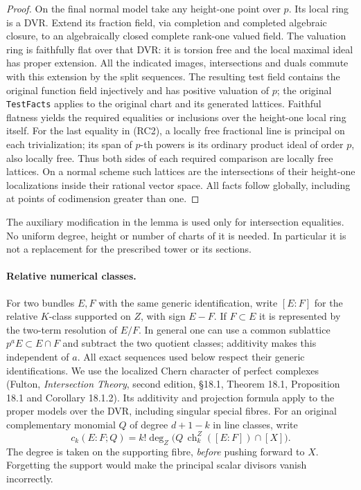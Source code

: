\begin{proof}
On the final normal model take any height-one point over \(p\).
Its local ring is a DVR. Extend its fraction field, via completion
and completed algebraic closure, to an algebraically closed
complete rank-one valued field. The valuation ring is faithfully
flat over that DVR: it is torsion free and the local maximal
ideal has proper extension. All the indicated images, intersections
and duals commute with this extension by the split sequences.
The resulting test field contains the original function field
injectively and has positive valuation of \(p\); the original
\texttt{TestFacts} applies to the original chart and its
generated lattices. Faithful flatness yields the required equalities
or inclusions over the height-one local ring itself.
For the last equality in (RC2), a locally free fractional
line is principal on each trivialization; its span of \(p\)-th
powers is its ordinary product ideal of order \(p\), also
locally free. Thus both sides of each required comparison
are locally free lattices. On a normal scheme such lattices
are the intersections of their height-one localizations
inside their rational vector space. All facts follow globally,
including at points of codimension greater than one.
\end{proof}

The auxiliary modification in the lemma is used only for
intersection equalities. No uniform degree, height or number of
charts of it is needed. In particular it is not a replacement
for the prescribed tower or its sections.

\paragraph{Relative numerical classes.}
For two bundles \(E,F\) with the same generic identification,
write \([E:F]\) for the relative \(K\)-class supported on
\(Z\), with sign \(E-F\). If \(F\subset E\) it is represented
by the two-term resolution of \(E/F\). In general one can
use a common sublattice \(p^a E\subset E\cap F\) and subtract
the two quotient classes; additivity makes this independent
of \(a\). All exact sequences used below respect their generic
identifications. We use the localized Chern character of
perfect complexes (Fulton, \emph{Intersection Theory},
second edition, \S18.1, Theorem 18.1, Proposition 18.1 and
Corollary 18.1.2). Its additivity and projection formula apply
to the proper models over the DVR, including singular
special fibres. For an original complementary monomial \(Q\)
of degree \(d+1-k\) in line classes, write
\[
 c_k(E:F;Q)=k!\deg_Z
       \bigl(Q\,\operatorname{ch}^{Z}_k([E:F])\cap[X]\bigr).
\]
The degree is taken on the supporting fibre, \emph{before}
pushing forward to \(X\). Forgetting the support would make
the principal scalar divisors vanish incorrectly.

